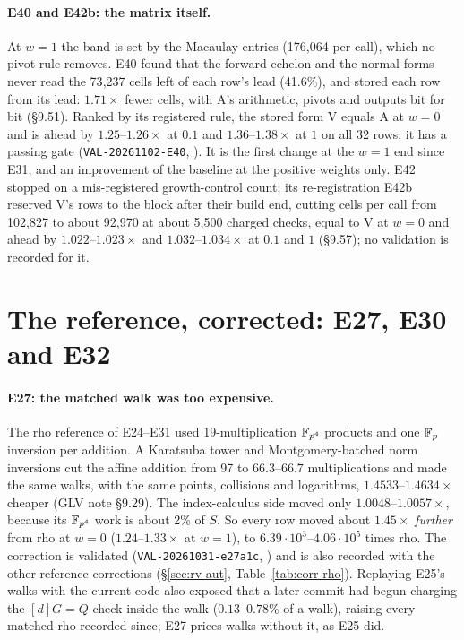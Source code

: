 \paragraph{E40 and E42b: the matrix itself.} At $w=1$ the band is set by the
Macaulay entries (176{,}064 per call), which no pivot rule removes. E40 found
that the forward echelon and the normal forms never read the 73{,}237 cells left
of each row's lead (41.6\%), and stored each row from its lead: $1.71\times$ fewer
cells, with A's arithmetic, pivots and outputs bit for bit (\S9.51). Ranked by
its registered rule, the stored form V equals A at $w=0$ and is ahead by
$1.25$--$1.26\times$ at $0.1$ and $1.36$--$1.38\times$ at $1$ on all 32 rows; it has a
passing gate (\texttt{VAL-20261102-E40},
). It is the first change at the
$w=1$ end since E31, and an improvement of the baseline at the positive weights
only. E42 stopped on a mis-registered growth-control count; its re-registration
E42b reserved V's rows to the block after their build end, cutting cells per
call from 102{,}827 to about 92{,}970 at about 5{,}500 charged checks, equal to V at
$w=0$ and ahead by $1.022$--$1.023\times$ and $1.032$--$1.034\times$ at $0.1$ and $1$
(\S9.57); no validation is recorded for it.

\section{The reference, corrected: E27, E30 and E32}\label{sec:glv-reference}

\paragraph{E27: the matched walk was too expensive.} The rho reference of
E24--E31 used 19-multiplication $\mathbb{F}_{p^4}$ products and one $\mathbb{F}_p$ inversion per
addition. A Karatsuba tower and Montgomery-batched norm inversions cut the
affine addition from 97 to $66.3$--$66.7$ multiplications and made the same
walks, with the same points, collisions and logarithms, $1.4533$--$1.4634\times$
cheaper (GLV note \S9.29). The index-calculus side moved only
$1.0048$--$1.0057\times$, because its $\mathbb{F}_{p^4}$ work is about 2\% of $S$. So every
row moved about $1.45\times$ \emph{further} from rho at $w=0$ ($1.24$--$1.33\times$ at
$w=1$), to $6.39\cdot10^3$--$4.06\cdot10^5$ times rho. The correction is validated
(\texttt{VAL-20261031-e27a1c}, )
and is also recorded with the other reference corrections
(\S\ref{sec:rv-aut}, Table~\ref{tab:corr-rho}). Replaying E25's walks with the
current code also exposed that a later commit had begun charging the
$[d]G=Q$ check inside the walk ($0.13$--$0.78\%$ of a walk), raising every matched
rho recorded since; E27 prices walks without it, as E25 did.


